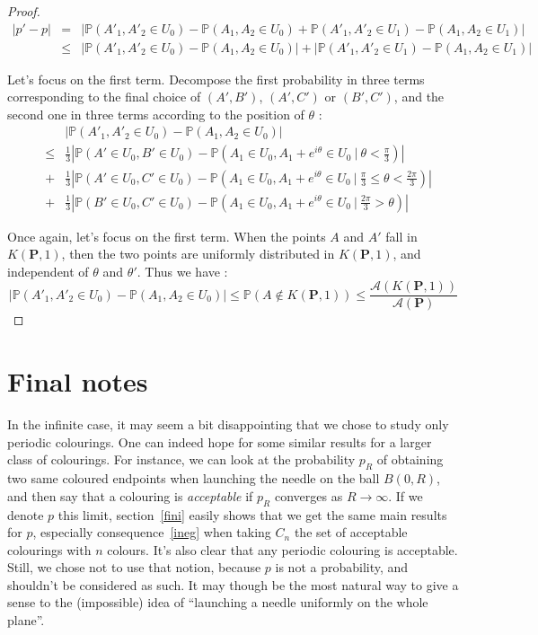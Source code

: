 \documentclass[a4paper,11pt]{article}
\theoremstyle{definition}
\theoremstyle{remark}
\begin{document}
\begin{proof}

\begin{eqnarray*}
|p' - p| 
  &=& | \mathbb{P}(A'_1 , A'_2 \in U_0) - \mathbb{P}(A_1 , A_2 \in U_0) + \mathbb{P}(A'_1 , A'_2 \in U_1) - \mathbb{P}(A_1 , A_2 \in U_1) | \\
  &\leq& | \mathbb{P}(A'_1 , A'_2 \in U_0) - \mathbb{P}(A_1 , A_2 \in U_0) | + | \mathbb{P}(A'_1 , A'_2 \in U_1) - \mathbb{P}(A_1 , A_2 \in U_1) | 
\end{eqnarray*}

Let's focus on the first term. 
Decompose the first probability in three terms corresponding to the final 
choice of $(A',B')$, $(A',C')$ or $(B',C')$, and the second one in three terms 
according to the position of $\theta$ :
\begin{eqnarray*}
& & \left| \mathbb{P}(A'_1 , A'_2 \in U_0) - \mathbb{P}(A_1 , A_2 \in U_0) \right| \\
&\leq& \frac{1}{3} \left| \mathbb{P}(A' \in U_0 , B' \in U_0) - \mathbb{P}(A_1 \in U_0 , A_1 + e^{i \theta} \in U_0 \ |\  \theta < \frac{\pi}{3} ) \right| \\
&+& \frac{1}{3} \left| \mathbb{P}(A' \in U_0 , C' \in U_0) - \mathbb{P}(A_1 \in U_0 , A_1 + e^{i \theta} \in U_0 \ |\  \frac{\pi}{3} \leq \theta < \frac{2 \pi}{3} ) \right| \\
&+& \frac{1}{3} \left| \mathbb{P}(B' \in U_0 ,C' \in U_0) - \mathbb{P}(A_1 \in U_0 , A_1 + e^{i \theta} \in U_0 \ | \  \frac{2 \pi}{3} > \theta ) \right|
\end{eqnarray*}

Once again, let's focus on the first term. When the points $A$ and 
$A'$ fall in $K(\mathbf{P},1)$, then the two points are uniformly distributed in 
$K(\mathbf{P},1)$, and independent of $\theta$ and $\theta'$. Thus we have : 
$$ \left| \mathbb{P}(A'_1 , A'_2 \in U_0) - \mathbb{P}(A_1 , A_2 \in U_0) \right| \leq \mathbb P(A \not \in K(\mathbf{P},1)) \leq \frac{\mathcal{A}(K(\mathbf{P},1))}{\mathcal{A}(\mathbf{P})} $$


\end{proof}

\section{Final notes}
In the infinite case, it may seem a bit disappointing that we chose to study 
only periodic colourings. One can indeed hope for some similar results for a 
larger class of colourings. For instance, we can look at the probability $p_R$ 
of obtaining two same coloured endpoints when launching the needle on the ball 
$B(0,R)$, and then say that a colouring is \emph{acceptable} if $p_R$ converges 
as $R \rightarrow \infty$. If we denote $p$ this limit, section~\ref{fini} 
easily shows that we get the same main results for $p$, especially
consequence~\ref{ineg} when taking $C_n$ the set of acceptable colourings with $n$ colours. 
It's also clear that any periodic colouring is acceptable. Still, we chose not 
to use that notion, because $p$ is not a probability, and shouldn't be 
considered as such. It may though be the most natural way to give a sense to 
the (impossible) idea of ``launching a needle uniformly on the whole plane''.
\end{document}
